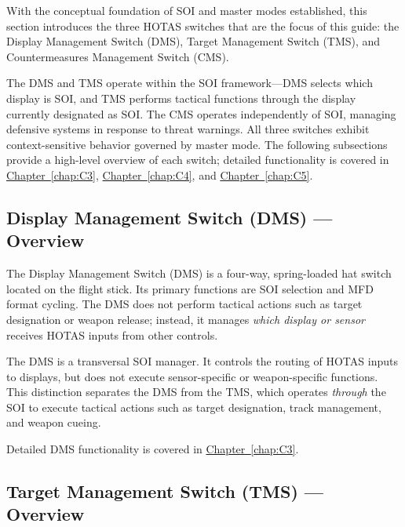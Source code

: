 \documentclass[11pt, a4paper, twoside]{report}
\newcommand{\chapref}[1]{\hyperref[#1]{Chapter~\ref*{#1}}}
\begin{document}
With the conceptual foundation of SOI and master modes established, this section introduces the three HOTAS switches that are the focus of this guide: the Display Management Switch (DMS), Target Management Switch (TMS), and Countermeasures Management Switch (CMS).

The DMS and TMS operate within the SOI framework—DMS selects which display is SOI, and TMS performs tactical functions through the display currently designated as SOI. The CMS operates independently of SOI, managing defensive systems in response to threat warnings. All three switches exhibit context-sensitive behavior governed by master mode. The following subsections provide a high-level overview of each switch; detailed functionality is covered in \chapref{chap:C3}, \chapref{chap:C4}, and \chapref{chap:C5}.

\subsection{Display Management Switch (DMS) — Overview}
\label{sec:C2-S3-S1}

The Display Management Switch (DMS) is a four-way, spring-loaded hat switch located on the flight stick. Its primary functions are SOI selection and MFD format cycling. The DMS does not perform tactical actions such as target designation or weapon release; instead, it manages \textit{which display or sensor} receives HOTAS inputs from other controls.

The DMS is a transversal SOI manager. It controls the routing of HOTAS inputs to displays, but does not execute sensor-specific or weapon-specific functions. This distinction separates the DMS from the TMS, which operates \textit{through} the SOI to execute tactical actions such as target designation, track management, and weapon cueing.

Detailed DMS functionality is covered in \chapref{chap:C3}.

\subsection{Target Management Switch (TMS) — Overview}
\label{sec:C2-S3-S2}
\end{document}
